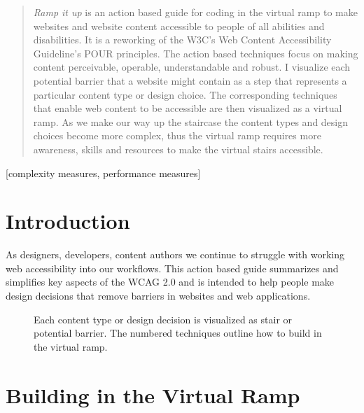 \documentclass{acm_proc_article-sp}
\begin{document}
\maketitle
\begin{abstract}
\textit{Ramp it up} is an action based guide for coding in the virtual ramp to make websites and website content accessible to people of all abilities and disabilities. It is a reworking of the W3C's Web Content Accessibility Guideline's POUR principles. The action based techniques focus on making content perceivable, operable, understandable and robust. I visualize each potential barrier that a website might contain as a step that represents a particular content type or design choice. The corresponding techniques that enable web content to be accessible are then visualized as a virtual ramp. As we make our way up the staircase the content types and design choices become more complex, thus the virtual ramp requires more awareness, skills and resources to make the virtual stairs accessible.

\end{abstract}

[complexity measures, performance measures]



\section{Introduction}
As designers, developers, content authors we continue to struggle with working web accessibility into our workflows. This action based guide summarizes and simplifies key aspects of the WCAG 2.0 and is intended to help people make design decisions that remove barriers in websites and web applications.

\begin{figure*}
\centering
{}
\caption{Each content type or design decision is visualized as stair or potential barrier. The numbered techniques outline how to build in the virtual ramp.}
\end{figure*}

\section{Building in the {\secit Virtual} Ramp}
\end{document}
